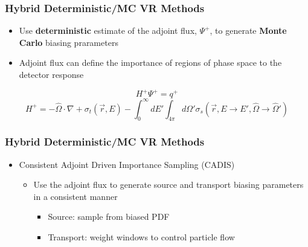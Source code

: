 \documentclass{beamer}
\begin{document}
\begin{frame}
\frametitle{Hybrid Deterministic/MC VR Methods}
\begin{itemize}
\item{Use \textbf{deterministic} estimate of the adjoint flux, $\Psi^+$, to generate \textbf{Monte Carlo} biasing prarameters}
\end{itemize}
\begin{itemize}
\item{Adjoint flux can define the importance of regions of phase space to the detector response}
\end{itemize}

\vspace{0.2cm}
       \begin{equation}
        H^+\Psi^+ = q^+
       \end{equation} 
       \begin{equation}
	H^{+} = -\widehat{\Omega} \cdot \nabla +
	    \sigma_{t}(\overrightarrow{r},E) - 
		\int_{0}^{\infty} dE'
		\int_{4\pi} d\Omega'
		\sigma_{s}( \overrightarrow{r}, E 
		\rightarrow E', \widehat{\Omega} 
		\rightarrow \widehat{\Omega}' )
       \end{equation}
\end{frame}

\begin{frame}
\frametitle{Hybrid Deterministic/MC VR Methods}
\begin{itemize}
\item{Consistent Adjoint Driven Importance Sampling (CADIS)}
  \begin{itemize}
  \item{Use the adjoint flux to generate source and transport biasing parameters in a consistent manner}
    \begin{itemize}
    \item{Source: sample from biased PDF}
    \item{Transport: weight windows to control particle flow}
    \end{itemize}
  \end{itemize}
\end{itemize}
\end{frame}
\end{document}
